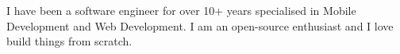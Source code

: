 \documentclass[9pt]{developercv} %
\begin{document}
\vspace{0.5cm}



\begin{minipage}[t]{0.4\textwidth} %
	\vspace{-\baselineskip} %
I have been a software engineer for over 10+ years specialised in  Mobile Development and Web Development. I am  an open-source enthusiast
and I love build things from scratch. 

\end{minipage}
\hfill %
\begin{minipage}[t]{0.5\textwidth} %
	\vspace{-\baselineskip} %
	\begin{barchart}{5.5}
	\end{barchart}
\end{minipage}

\end{document}
